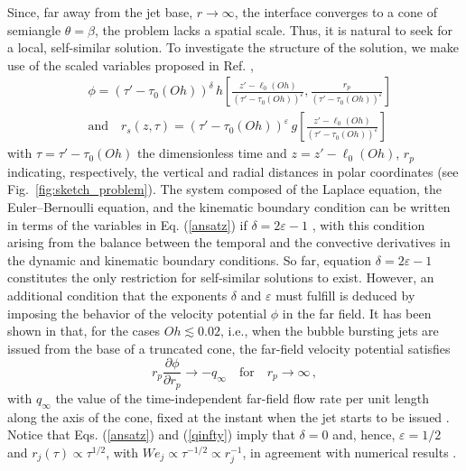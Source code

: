 \documentclass[twocolumn]{revtex4-2}
\begin{document}
Since, far away from the jet base, $r\rightarrow\infty$, the interface converges to a cone of semiangle $\theta=\beta$, the problem lacks a spatial scale. Thus, it is natural to seek for a local, self-similar solution. To investigate the structure of the solution, we make use of the scaled variables proposed in Ref. \cite{Zeff},
\begin{equation}
\begin{split}
&\phi=\left(\tau'-\tau_0(Oh)\right)^\delta\,h\left[\frac{z'-\ell_0(Oh)}{\left(\tau'-\tau_0(Oh)\right)^\varepsilon},\frac{r_p}{\left(\tau'-\tau_0(Oh)\right)^\varepsilon}\right] \\ &\mathrm{and}\quad
r_s(z,\tau)=\left(\tau'-\tau_0(Oh)\right)^\varepsilon\,g\left[\frac{z'-\ell_0(Oh)}{\left(\tau'-\tau_0(Oh)\right)^\varepsilon}\right]\, \label{ansatz}
\end{split}
\end{equation}
 with $\tau=\tau'-\tau_0(Oh)$ the dimensionless time and $z=z'-\ell_0(Oh)$, $r_p$ indicating, respectively, the vertical and radial distances in polar coordinates (see Fig.~\ref{fig:sketch_problem}). The system composed of the Laplace equation, the Euler--Bernoulli equation, and the kinematic boundary condition can be written in terms of the variables in Eq. (\ref{ansatz}) if $\delta=2\varepsilon-1$ \cite{Zeff}, with this condition arising from the balance between the temporal and the convective derivatives in the dynamic and kinematic boundary conditions. So far, equation $\delta=2\varepsilon-1$ constitutes the only restriction for self-similar solutions to exist. However, an additional condition that the exponents $\delta$ and $\varepsilon$ must fulfill is deduced by imposing the behavior of the velocity potential $\phi$ in the far field. It has been shown in \cite{PRF2023} that, for the cases $Oh\lesssim 0.02$, i.e., when the bubble bursting jets are issued from the base of a truncated cone, the far-field velocity potential satisfies
\begin{equation}
r_p\frac{\partial\phi}{\partial r_p}\rightarrow -q_\infty\quad\mathrm{for}\quad r_p\rightarrow\infty\, ,\label{qinfty}
\end{equation}
with $q_\infty$ the value of the time-independent far-field flow rate per unit length along the axis of the cone, fixed at the instant when the jet starts to be issued \cite{PRF2023}. Notice that Eqs. (\ref{ansatz}) and (\ref{qinfty}) imply that $\delta=0$ and, hence, $\varepsilon=1/2$ and $r_j(\tau)\propto \tau^{1/2}$, with $We_j\propto \tau^{-1/2}\propto r^{-1}_j$, in agreement with numerical results \cite{PRF2023}.
\end{document}
